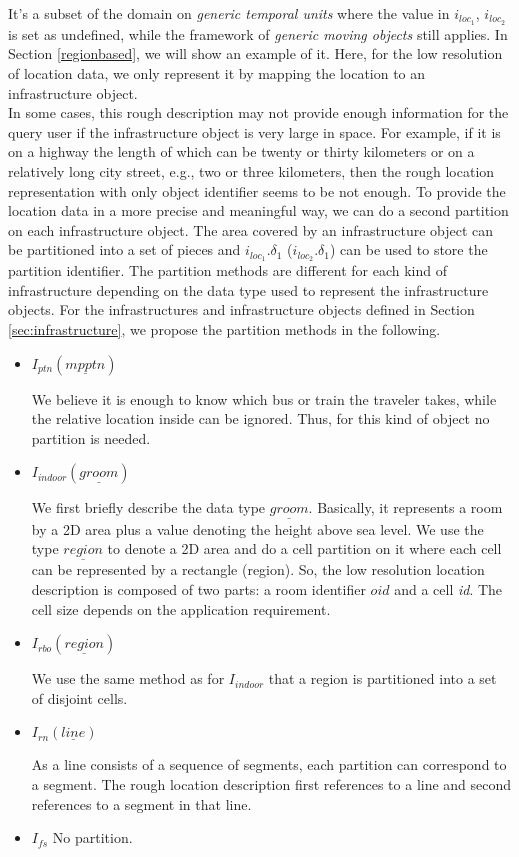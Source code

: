 It's a subset of the domain on \textit{generic temporal units} where the value in $i_{loc_1}$,
$i_{loc_2}$ is set as undefined, while the framework of \textit{generic moving objects} still 
applies. In Section \ref{regionbased}, we will show an example of it. Here, for the low resolution of
location data, we only represent it by mapping the location to an infrastructure object. \\

In some cases, this rough description may not provide enough information for the query user if the infrastructure object is very large in space. For example, if it is on a highway the length of which can be twenty or thirty kilometers or on a relatively long city street, e.g., two or three kilometers, then the rough location representation with only object identifier seems to be not enough. To provide the location data in a more precise and meaningful way, we can do a second partition on each infrastructure object. The area covered by an infrastructure object can be partitioned into a set of pieces and $i_{loc_1}.\delta_1$ ($i_{loc_2}.\delta_1$) can be used to store the partition identifier. 
The partition methods are different for each kind of infrastructure depending on the data type used to represent the infrastructure objects. For the infrastructures and infrastructure objects defined in Section \ref{sec:infrastructure}, we propose the partition methods in the following. 

\begin{itemize}
 \item $I_{ptn}(\underline{mpptn})$ 

We believe it is enough to know which bus or train the traveler takes, while the relative location inside can be ignored. Thus, for this kind of object no partition is needed. 

 \item  $I_{indoor}(\underline{groom})$ 

We first briefly describe the data type $\underline{groom}$. Basically, it represents a room by a 2D area plus a value denoting the height above sea level. We use the type $\underline{region}$ to denote a 2D area and do a cell partition on it where each cell can be represented by a rectangle (region). So, the low resolution location description is composed of two parts: a room identifier $oid$ and a cell \textit{id}. The cell size depends on the application requirement. 

 \item  $I_{rbo}(\underline{region})$

We use the same method as for $I_{indoor}$ that a region is partitioned into a set of disjoint cells. 

 \item  $I_{rn}(\underline{line})$

As a line consists of a sequence of segments, each partition can correspond to a segment. The rough
location description first references to a line and second references to a segment in that line. 

 \item  $I_{fs}$ \hspace{0.2cm} No partition.
\end{itemize}

